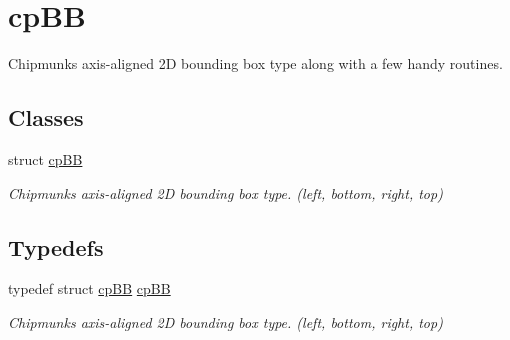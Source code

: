 \hypertarget{group__cp_b_b_b}{}\section{cp\+B\+B}
\label{group__cp_b_b_b}


Chipmunk\textquotesingle{}s axis-\/aligned 2\+D bounding box type along with a few handy routines.  


\subsection*{Classes}
\begin{DoxyCompactItemize}
\item 
struct \hyperlink{structcp_b_b}{cp\+B\+B}
\begin{DoxyCompactList}\small\item\em Chipmunk\textquotesingle{}s axis-\/aligned 2\+D bounding box type. (left, bottom, right, top) \end{DoxyCompactList}\end{DoxyCompactItemize}
\subsection*{Typedefs}
\begin{DoxyCompactItemize}
\item 
\hypertarget{group__cp_b_b_b_ga94835b3c44de11eae51d596f39a5fabc}{}typedef struct \hyperlink{structcp_b_b}{cp\+B\+B} \hyperlink{group__cp_b_b_b_ga94835b3c44de11eae51d596f39a5fabc}{cp\+B\+B}\label{group__cp_b_b_b_ga94835b3c44de11eae51d596f39a5fabc}

\begin{DoxyCompactList}\small\item\em Chipmunk\textquotesingle{}s axis-\/aligned 2\+D bounding box type. (left, bottom, right, top) \end{DoxyCompactList}\end{DoxyCompactItemize}

